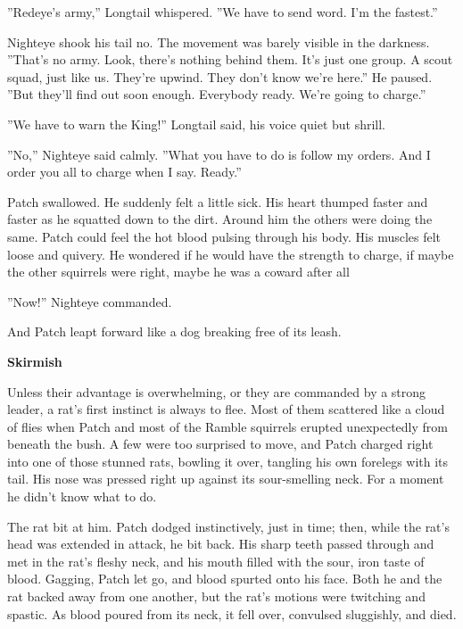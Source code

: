\documentclass[11pt]{article}
\begin{document}
 ''Redeye's army,'' Longtail whispered. ''We have to send word. I'm the fastest.''\par
 Nighteye shook his tail no. The movement was barely visible in the darkness. ''That's no army. Look, there's nothing behind them. It's just one group. A scout squad, just like us. They're upwind. They don't know we're here.'' He paused. ''But they'll find out soon enough. Everybody ready. We're going to charge.''\par
 ''We have to warn the King!'' Longtail said, his voice quiet but shrill.\par
 ''No,'' Nighteye said calmly. ''What you have to do is follow my orders. And I order you all to charge when I say. Ready.''\par
 Patch swallowed. He suddenly felt a little sick. His heart thumped faster and faster as he squatted down to the dirt. Around him the others were doing the same. Patch could feel the hot blood pulsing through his body. His muscles felt loose and quivery. He wondered if he would have the strength to charge, if maybe the other squirrels were right, maybe he was a coward after all %
\par
 ''Now!'' Nighteye commanded.\par
And Patch leapt forward like a dog breaking free of its leash.\par
\par
{\bf Skirmish\par
}\par
 Unless their advantage is overwhelming, or they are commanded by a strong leader, a rat's first instinct is always to flee. Most of them scattered like a cloud of flies when Patch and most of the Ramble squirrels erupted unexpectedly from beneath the bush. A few were too surprised to move, and Patch charged right into one of those stunned rats, bowling it over, tangling his own forelegs with its tail. His nose was pressed right up against its sour-smelling neck. For a moment he didn't know what to do.\par
 The rat bit at him. Patch dodged instinctively, just in time; then, while the rat's head was extended in attack, he bit back. His sharp teeth passed through and met in the rat's fleshy neck, and his mouth filled with the sour, iron taste of blood. Gagging, Patch let go, and blood spurted onto his face. Both he and the rat backed away from one another, but the rat's motions were twitching and spastic. As blood poured from its neck, it fell over, convulsed sluggishly, and died.\par
\end{document}
